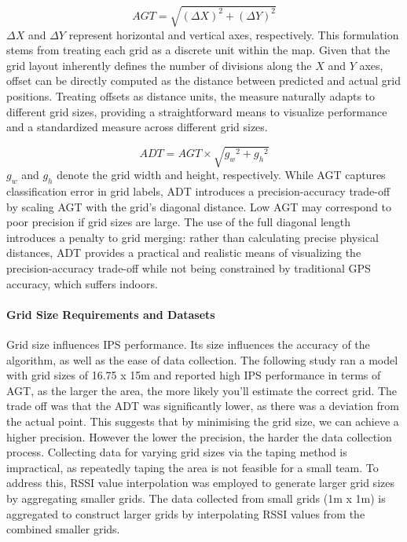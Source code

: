 \documentclass[runningheads]{llncs}
\begin{document}
\begin{equation}
	AGT = \sqrt{(\Delta X)^2 + (\Delta Y)^2}
	\label{eq:agt}
\end{equation}
$\Delta X$ and $\Delta Y$ represent horizontal and vertical axes, respectively. This formulation stems from treating each grid as a discrete unit within the map. Given that the grid layout inherently defines the number of divisions along the $X$ and $Y$ axes, offset can be directly computed as the distance between predicted and actual grid positions. Treating offsets as distance units, the measure naturally adapts to different grid sizes, providing a straightforward means to visualize performance and a standardized measure across different grid sizes.

\begin{equation}
	ADT = AGT \times \sqrt{{g_w}^2 + {g_h}^2}
	\label{eq:adt}
\end{equation}
$g_w$ and $g_h$ denote the grid width and height, respectively. While AGT captures classification error in grid labels, ADT introduces a precision-accuracy trade-off by scaling AGT with the grid’s diagonal distance. Low AGT may correspond to poor precision if grid sizes are large. The use of the full diagonal length introduces a penalty to grid merging: rather than calculating precise physical distances, ADT provides a practical and realistic means of visualizing the precision-accuracy trade-off while not being constrained by traditional GPS accuracy, which suffers indoors.

\paragraph{Grid Size Requirements and Datasets} Grid size influences IPS performance. Its size influences the accuracy of the algorithm, as well as the ease of data collection. The following study \cite{LRE1} ran a model with grid sizes of 16.75 x 15m and reported high IPS performance in terms of AGT, as the larger the area, the more likely you’ll estimate the correct grid. The trade off was that the ADT was significantly lower, as there was a deviation from the actual point. This suggests that by minimising the grid size, we can achieve a higher precision. However the lower the precision, the harder the data collection process. 
Collecting data for varying grid sizes via the taping method is impractical, as repeatedly taping the area is not feasible for a small team. To address this, RSSI value interpolation was employed to generate larger grid sizes by aggregating smaller grids. The data collected from small grids (1m x 1m) is aggregated to construct larger grids by interpolating RSSI values from the combined smaller grids.
\end{document}
